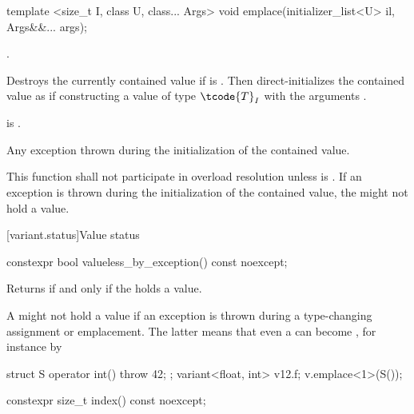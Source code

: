 %
\begin{itemdecl}
template <size_t I, class U, class... Args> void emplace(initializer_list<U> il, Args&&... args);
\end{itemdecl}

\begin{itemdescr}
\pnum
\requires
{}.

\pnum
\effects
Destroys the currently contained value if 
is . Then direct-initializes the contained value as if
constructing a value of type $\tcode{T}_I$ with the arguments
.

\pnum
\postconditions
{} is .

\pnum
\throws
Any exception thrown during the initialization of the contained value.

\pnum
\remarks
This function shall not participate in overload resolution unless
 is .
If an exception is thrown during the initialization of the contained value,
the  might not hold a value.
\end{itemdescr}

[variant.status]{Value status}

%
\begin{itemdecl}
constexpr bool valueless_by_exception() const noexcept;
\end{itemdecl}

\begin{itemdescr}
\pnum
\effects
Returns  if and only if the  holds a value.

\pnum
\begin{note}
A  might not hold a value if an exception is thrown during a
type-changing assignment or emplacement. The latter means that even a
 can become , for
instance by
\begin{codeblock}
struct S { operator int() { throw 42; }};
variant<float, int> v{12.f};
v.emplace<1>(S());
\end{codeblock}
\end{note}
\end{itemdescr}

%
\begin{itemdecl}
constexpr size_t index() const noexcept;
\end{itemdecl}

